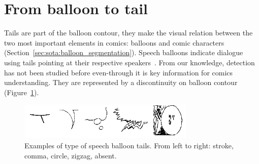 

\section{From balloon to tail} %
\label{sec:se:from_balloon_to_tail}


Tails are part of the balloon contour, they make the visual relation between the two most important elements in comics: balloons and comic characters (Section~\ref{sec:sota:balloon_segmentation}).
Speech balloons indicate dialogue using tails pointing at their respective speakers~\cite{Varnum2007Language}.
From our knowledge, detection has not been studied before even-through it is key information for comics understanding.
They are represented by a discontinuity on balloon contour (Figure~\ref{fig:se:tail_types}).

    \begin{figure}[h]%
      \centering
      \includegraphics[trim= 0px 0px 0mm 0mm, clip, width=0.75\textwidth]{tail_types.png}
    \caption[Examples of type of speech balloon tails]{Examples of type of speech balloon tails. From left to right: stroke, comma, circle, zigzag, absent.}
    \label{fig:se:tail_types}
    \end{figure}

